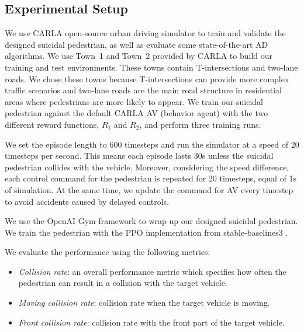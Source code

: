 \documentclass[letterpaper, 10 pt, conference]{ieeeconf}
\newcommand{\Rs}{R_1}
\newcommand{\Rc}{R_2}
\begin{document}
\subsection{Experimental Setup}

We use CARLA \cite{dosovitskiy2017carla} open-source urban driving simulator to train and validate the designed suicidal pedestrian, as well as evaluate some state-of-the-art AD algorithms.
We use Town~1 and Town~2 provided by CARLA to build our training and test environments. These towns contain T-intersections and two-lane roads.  We chose these towns because
T-intersections can provide more complex traffic scenarios and two-lane roads are the main road structure in residential areas where pedestrians are more likely to appear.
We train our suicidal pedestrian against the default CARLA AV (behavior agent) with the two different reward functions, $\Rs$ and $\Rc$, and perform three training runs.

We set the episode length to 600 timesteps and run the simulator at a speed of 20 timesteps per second. This means each episode lasts 30s unless the suicidal pedestrian collides with the vehicle. Moreover, considering the speed difference, each control command for the pedestrian is repeated for 20 timesteps, equal of 1s of simulation. At the same time, we update the command for AV every timestep to avoid accidents caused by delayed controls. 

We use the OpenAI Gym \cite{OpenAIGym} framework to wrap up our designed suicidal pedestrian. We train the pedestrian with the PPO \cite{PPO} implementation from stable-baselines3 \cite{stable-baselines3}.




We evaluate the performance using the following metrics:
\begin{itemize}
\item \textit{Collision rate}: %
an overall performance metric which specifies how often the pedestrian can result in a collision with the target vehicle.

\item \textit{Moving collision rate}: collision rate when the target vehicle is moving.

\item \textit{Front collision rate}: collision rate with the front part of the target vehicle.
\end{itemize}
\end{document}
